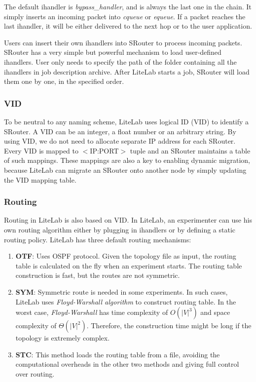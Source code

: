 \documentclass[conference]{IEEEtran}
\begin{document}
The default ihandler is \textit{bypass\_handler}, and is always the
last one in the chain. It simply inserts an incoming packet into
\textit{cqueue} or \textit{equeue}. If a packet reaches the last
ihandler, it will be either delivered to the next hop or to the user
application.

Users can insert their own ihandlers into SRouter to process incoming
packets. SRouter has a very simple but powerful mechanism to load
user-defined ihandlers. User only needs to specify the path of the
folder containing all the ihandlers in job description archive. After
LiteLab starts a job, SRouter will load them one by one, in the
specified order. 

\subsubsection{VID}

To be neutral to any naming scheme, LiteLab uses logical ID (VID) to
identify a SRouter. A VID can be an integer, a float number or an
arbitrary string. By using VID, we do not need to allocate separate IP
address for each SRouter. Every VID is mapped to $<$IP:PORT$>$ tuple
and an SRouter maintains a table of such mappings. These mappings are
also a key to enabling dynamic migration, because LiteLab can migrate
an SRouter onto another node by simply updating the VID mapping table.








\subsubsection{Routing}
Routing in LiteLab is also based on VID. In LiteLab, an experimenter
can use his own routing algorithm either by plugging in ihandlers or
by defining a static routing policy.
LiteLab has three default routing mechanisms:

\begin{enumerate}

\item \textbf{OTF}: Uses OSPF\cite{RFC2328} protocol. Given the
  topology file as input, the routing table is calculated on the fly
  when an experiment starts. The routing table construction is fast,
  but the routes are not symmetric.

\item \textbf{SYM}: Symmetric route is needed in some experiments. In
  such cases, LiteLab uses \textit{Floyd-Warshall
    algorithm}\cite{Floyd:1962:A9A:367766.368166} to construct routing
  table. In the worst case, \textit{Floyd-Warshall} has time
  complexity of $O(|V|^3)$ and space complexity of $\Theta(|V|^2)$.
  Therefore, the construction time might be long if the topology is
  extremely complex.

\item \textbf{STC}: This method loads the routing table from a file,
  avoiding the computational overheads in the other two methods and
  giving full control over routing.


\end{enumerate}
\end{document}

